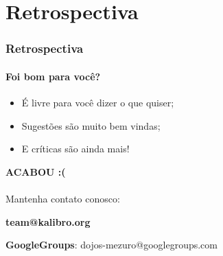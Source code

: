 \documentclass{beamer}
\begin{document}
\section{Retrospectiva}
\begin{frame}
  \frametitle{Retrospectiva}
  \framesubtitle{Foi bom para você?}

  \begin{itemize}
    \item É livre para você dizer o que quiser;
    \item Sugestões são muito bem vindas;
    \item E críticas são ainda mais!
  \end{itemize}
\end{frame}

\begin{frame}
  \LARGE{\textbf{ACABOU :(}} \\~\\

  Mantenha contato conosco:

  \textbf{team@kalibro.org}

  \textbf{GoogleGroups}: dojos-mezuro@googlegroups.com
\end{frame}
\end{document}
